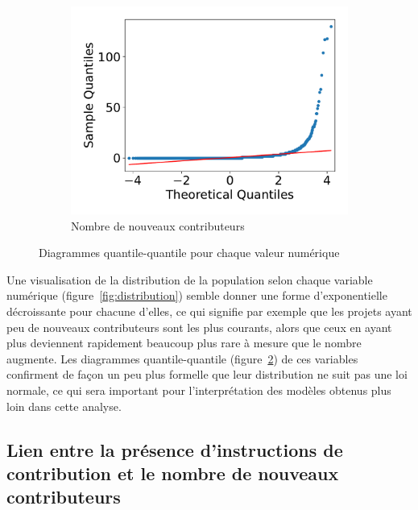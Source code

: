 \documentclass[dvipsnames]{llncs}
\begin{document}
\begin{figure}[ht]
\begin{subfigure}[t]{0.3\textwidth}
            \includegraphics[width=\textwidth]{../experiment/data_analysis/newContributorCount_qqplot}
            \caption{Nombre de nouveaux contributeurs}
            \label{sfig:newContributorQQplot}
        \end{subfigure}

        \caption{Diagrammes quantile-quantile pour chaque valeur numérique}
        \label{fig:qqplots}
    \end{figure}

    Une visualisation de la distribution de la population selon chaque variable numérique
    (figure~\ref{fig:distribution}) semble donner une forme d'exponentielle décroissante pour chacune d'elles,
    ce qui signifie par exemple que les projets ayant peu de nouveaux contributeurs sont les plus courants,
    alors que ceux en ayant plus deviennent rapidement beaucoup plus rare à mesure que le nombre augmente. Les
    diagrammes quantile-quantile (figure~\ref{fig:qqplots}) de ces variables confirment de façon un peu plus
    formelle que leur distribution ne suit pas une loi normale, ce qui sera important pour l'interprétation
    des modèles obtenus plus loin dans cette analyse.

    \subsection{Lien entre la présence d'instructions de contribution et le nombre de nouveaux contributeurs}
\end{document}
